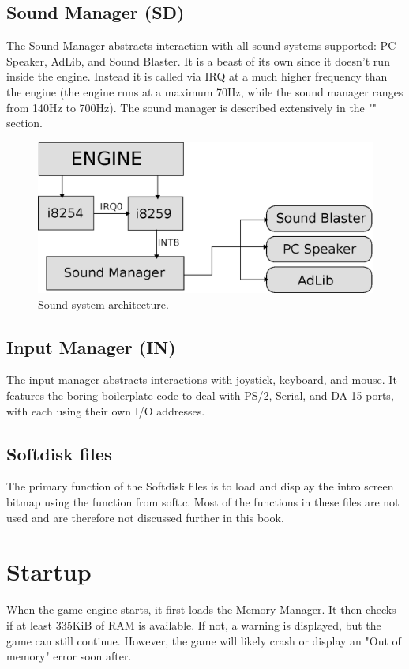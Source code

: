 \documentclass[book.tex]{subfiles}
\begin{document}
\subsection{Sound Manager (SD)}
The Sound Manager abstracts interaction with all sound systems supported: PC Speaker, AdLib, and Sound Blaster. It is a beast of its own since it doesn't run inside the engine. Instead it is called via IRQ at a much higher frequency than the engine (the engine runs at a maximum 70Hz, while the sound manager ranges from 140Hz to 700Hz). The sound manager is described extensively in the "" section. \\
 \par
\begin{figure}[H]
\centering
 \includegraphics[width=\textwidth]{imgs/drawings/sound_manager_architecture.eps}
 \caption{Sound system architecture.}
 \end{figure}
 \par


\subsection{Input Manager (IN)}
The input manager abstracts interactions with joystick, keyboard, and mouse. It features the boring boilerplate code to deal with PS/2, Serial, and DA-15 ports, with each using their own I/O addresses.

\subsection{Softdisk files}
The primary function of the Softdisk files is to load and display the intro screen bitmap using the  function from soft.c. Most of the functions in these files are not used and are therefore not discussed further in this book.
\pagebreak



\section{Startup}
When the game engine starts, it first loads the Memory Manager. It then checks if at least 335KiB of RAM is available. If not, a warning is displayed, but the game can still continue. However, the game will likely crash or display an "Out of memory" error soon after. \\
\end{document}
